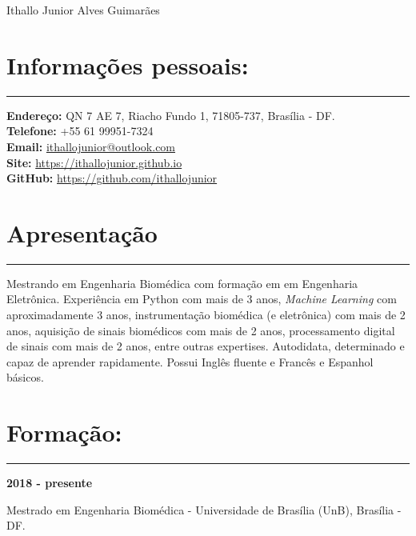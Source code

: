 \documentclass[11pt]{article}
\begin{document}
\begin{center}
\huge{Ithallo Junior Alves Guimarães}
\end{center}

\section{Informações pessoais:}
\hrule \vspace{0.1cm}
\begin{addmargin}{0.5cm}

\textbf{Endereço:}  QN 7 AE 7, Riacho Fundo 1, 71805-737, Brasília - DF. \\
\textbf{Telefone:}  +55 61 99951-7324 \\
\textbf{Email:}   \href{maito:ithallojunior@outlook.com}{ithallojunior@outlook.com} \\
\textbf{Site:}  \url{https://ithallojunior.github.io}  \\
\textbf{GitHub:} \url{https://github.com/ithallojunior}

\end{addmargin}

\section{Apresentação}
\hrule \vspace{0.1cm}

\begin{addmargin}{0.5cm}

Mestrando em Engenharia Biomédica com formação em em Engenharia Eletrônica. 
Experiência em Python com mais de 3 anos, 
\textit{Machine Learning} com aproximadamente 3 anos, instrumentação biomédica (e 
eletrônica) com mais de 2 anos, 
aquisição de sinais biomédicos com mais de 2 anos, processamento digital de sinais
com mais de 2 anos, entre outras expertises. Autodidata, determinado e 
capaz de aprender rapidamente. Possui Inglês fluente e Francês e Espanhol básicos.

\end{addmargin}

\section{Formação:}
\hrule \vspace{0.1cm}

\textbf{2018 - presente}
\begin{addmargin}{0.5cm}
Mestrado em Engenharia Biomédica - Universidade de Brasília (UnB), Brasília - DF. \\
\end{addmargin}
\end{document}
